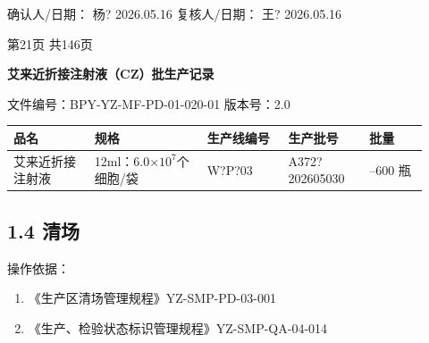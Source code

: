 \documentclass[UTF8,10pt,a4paper,fontset=fandol]{ctexart}
\newcommand{\fieldvalue}[1]{#1}
\newcommand{\handwritten}[1]{#1}
\begin{document}
确认人/日期：
\fieldvalue{\handwritten{杨?}}
\quad
\fieldvalue{\handwritten{2026.05.16}}
\hfill
复核人/日期：
\fieldvalue{\handwritten{王?}}
\quad
\fieldvalue{\handwritten{2026.05.16}}

\begin{center}
第21页 共146页
\end{center}

\newpage

\begin{center}
\textbf{艾来近折接注射液（CZ）批生产记录}
\end{center}

\noindent
文件编号：BPY-YZ-MF-PD-01-020-01 \qquad 版本号：2.0

\begin{tabular}{|p{0.18\linewidth}|p{0.25\linewidth}|p{0.18\linewidth}|p{0.18\linewidth}|p{0.13\linewidth}|}
\hline
\centering 品名 & \centering 规格 & \centering 生产线编号 & \centering 生产批号 & \centering 批量\\
\hline
\centering 艾来近折接注射液 &
\centering 12ml：6.0$\times 10^7$个细胞/袋 &
\centering \fieldvalue{\handwritten{W?P?03}} &
\centering \fieldvalue{\handwritten{A372?202605030}} &
\centering 200--600 瓶\\
\hline
\end{tabular}

\subsection{1.4 清场}

操作依据：

\begin{enumerate}
\item 《生产区清场管理规程》\hfill YZ-SMP-PD-03-001
\item 《生产、检验状态标识管理规程》\hfill YZ-SMP-QA-04-014
\end{enumerate}
\end{document}
